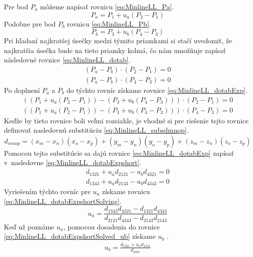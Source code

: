 Pre bod $P_a$ môžeme napísať rovnicu  \ref{eq:MinlineLL_Pa}.
\begin{equation}
P_a=P_1 + u_a(P_2-P_1)
    \label{eq:MinlineLL_Pa}
\end{equation}
Podobne pre bod $P_b$ rovnicu \ref{eq:MinlineLL_Pb}.
\begin{equation}
P_b=P_3 + u_b(P_4-P_3)
    \label{eq:MinlineLL_Pb}
\end{equation}
Pri hľadaní najkratšej úsečky medzi týmito priamkami si stačí uvedomiť, že najkratšia úsečka bude na tieto priamky kolmá, čo nám umožňuje zapísať následovné rovnice  \ref{eq:MinlineLL_dotab}.
\begin{equation}
\begin{aligned}
(P_a-P_b) \cdot (P_2-P_1) =0\\
(P_a-P_b) \cdot (P_4-P_3) =0
\end{aligned}
    \label{eq:MinlineLL_dotab}
\end{equation}
Po doplnení  $P_a$ a $P_b$ do týchto rovníc získame rovnice \ref{eq:MinlineLL_dotabExp}.
\begin{equation}
\begin{aligned}
((P_1 + u_a(P_2-P_1))-(P_3 + u_b(P_4-P_3))) \cdot (P_2-P_1) =0\\
((P_1 + u_a(P_2-P_1))-(P_3 + u_b(P_4-P_3))) \cdot (P_4-P_3) =0
\end{aligned}
    \label{eq:MinlineLL_dotabExp}
\end{equation}
Keďže by tieto rovnice boli veľmi rozsiahle, je vhodné si pre riešenie tejto rovnice definovať nasledovnú substitúciu \ref{eq:MinlineLL_subsdmnop}.
\begin{equation}
d_{mnop}=(x_m - x_n)(x_o-x_p)+(y_m - y_n)(y_o-y_p)+(z_m - z_n)(z_o-z_p)
    \label{eq:MinlineLL_subsdmnop}
\end{equation}
Pomocou tejto substitúcie sa dajú rovnice \ref{eq:MinlineLL_dotabExp} zapísať v~nasledovne \ref{eq:MinlineLL_dotabExpshort}.
\begin{equation}
\begin{aligned}
d_{1321} + u_a d_{2121} - u_b d_{4321} = 0\\
d_{1343} + u_a d_{2143} - u_b d_{4343} = 0
\end{aligned}
    \label{eq:MinlineLL_dotabExpshort}
\end{equation}
Vyriešením týchto rovníc pre $u_a$ získame rovnicu \ref{eq:MinlineLL_dotabExpshortSolving}.
\begin{equation}
 u_a= \frac
 {d_{1343} d_{4321} - d_{1321} d_{4343} }
 {d_{2121} d_{4343} - d_{2143} d_{2143} }
    \label{eq:MinlineLL_dotabExpshortSolving}
\end{equation}
Keď už poznáme $u_a$, pomocou dosadenia do rovnice \ref{eq:MinlineLL_dotabExpshortSolved_ub} získame $u_b$ \cite{bourke_Point_Line_Plane}.
\begin{equation}
\begin{aligned}
u_b  = \frac{d_{1321} + u_a d_{2121}}{d_{4321}}
\end{aligned}
    \label{eq:MinlineLL_dotabExpshortSolved_ub}
\end{equation}



